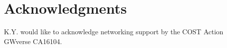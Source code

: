 \documentclass[prd,twocolumn,nofootinbib,superscriptaddress,amsmath,amssymb]{revtex4-1}
\begin{document}
\section*{Acknowledgments}\label{acknowledgments}
K.Y. would like to acknowledge networking support by the COST Action
GWverse CA16104. 


\end{document}
